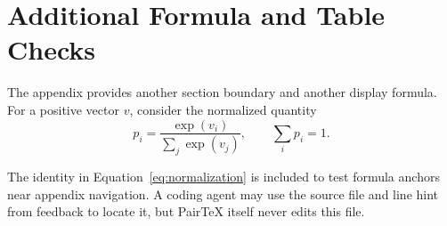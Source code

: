 \section{Additional Formula and Table Checks}
\label{app:checks}

The appendix provides another section boundary and another display formula.
For a positive vector $v$, consider the normalized quantity
\begin{equation}
  p_i = \frac{\exp(v_i)}{\sum_j \exp(v_j)}, \qquad \sum_i p_i = 1.
  \label{eq:normalization}
\end{equation}

The identity in Equation~\ref{eq:normalization} is included to test formula
anchors near appendix navigation. A coding agent may use the source file and
line hint from feedback to locate it, but PairTeX itself never edits this
file.
